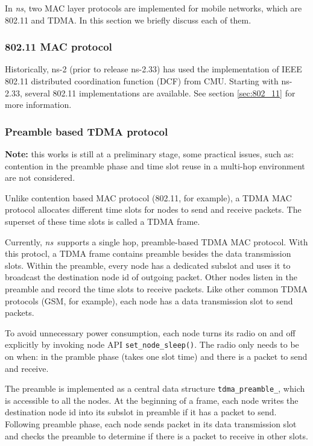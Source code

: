 In \emph{ns}, two MAC layer protocols are implemented for mobile networks,
  which are 802.11 and TDMA.
In this section
  we briefly discuss each of them.

\subsubsection{802.11 MAC protocol}
\label{sec:802_11_brief}

  Historically, ns-2 (prior to release ns-2.33)
  has used the implementation of IEEE 802.11 distributed coordination 
  function (DCF) from CMU. Starting with ns-2.33, several 802.11 
  implementations are available.  See section \ref{sec:802_11} for
  more information.

\subsubsection{Preamble based TDMA protocol}
\label{sec:tdma}
{\bf Note:} this works is still at a preliminary stage,
  some practical issues, such as:
  contention in the preamble phase and 
  time slot reuse in a multi-hop environment are not considered.

Unlike contention based MAC protocol (802.11, for example), 
  a TDMA MAC protocol allocates different time slots for nodes to 
  send and receive packets.
The superset of these time slots is called a TDMA frame.

Currently, \emph{ns}\ supports a single hop, 
  preamble-based TDMA MAC protocol.
With this protocl,
  a TDMA frame contains preamble besides the data transmission slots.
Within the preamble,
  every node has a dedicated subslot and
  uses it to broadcast the destination node id of outgoing packet.
Other nodes listen in the preamble and record 
  the time slots to receive packets.
Like other common TDMA protocols (GSM, for example),
  each node has a data transmission slot to send packets.

To avoid unnecessary power consumption,
  each node turns its radio on and off explicitly
  by invoking node API {\tt set\_node\_sleep()}.
The radio only needs to be on when:
  in the pramble phase (takes one slot time) and
  there is a packet to send and receive.

The preamble is implemented as a central data structure
  {\tt tdma\_preamble\_},
  which is accessible to all the nodes.
At the beginning of a frame,
  each node writes the destination node id into
  its subslot in preamble if it has a packet to send.
Following preamble phase,
  each node sends packet in its data transmission slot and
  checks the preamble to determine if 
  there is a packet to receive in other slots.

